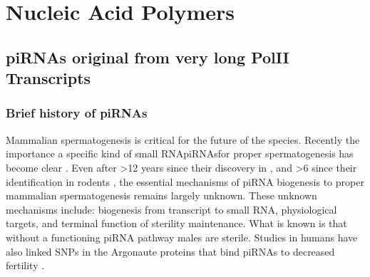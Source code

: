 
\section{Nucleic Acid Polymers}\label{hd: piRNA section}

  \subsection{piRNAs original from very long PolII Transcripts}\label{sec:Mouse piRNAs}

    \subsubsection{Brief history of piRNAs}


      Mammalian spermatogenesis is critical for the future of the species. Recently the importance a specific kind of small RNA\textemdash piRNAs\textemdash for proper spermatogenesis has become clear \citep{Siomi2011}. Even after >12 years since their discovery in \flies \citep{Aravin2001}, and >6 since their identification in rodents \citep{Girard2006, Lau2006}, the essential mechanisms of piRNA biogenesis to proper mammalian spermatogenesis remains largely unknown. These unknown mechanisms include: biogenesis from transcript to small RNA, physiological targets, and terminal function of sterility maintenance. What is known is that without a functioning piRNA pathway males are sterile. Studies in humans have also linked SNPs in the Argonaute proteins that bind piRNAs to decreased fertility \citep{Gu2010a}. 

